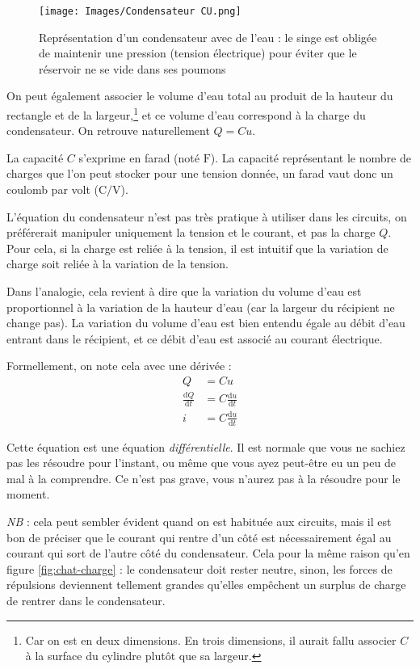 \documentclass{article}
\newcommand{\inc}{\fontfamily{cmr}\selectfont\textperiodcentered}
\begin{document}
\begin{figure}[h]
\centering
\texttt{[image: Images/Condensateur CU.png]}
\caption{Représentation d'un condensateur avec de l'eau : le singe est obligée de maintenir une pression (tension électrique) pour éviter que le réservoir ne se vide dans ses poumons}
\label{fig:reservoir}
\end{figure}

On peut également associer le volume d'eau total au produit de la hauteur du rectangle et de la largeur,\footnote{Car on est en deux dimensions. En trois dimensions, il aurait fallu associer $C$ à la surface du cylindre plutôt que sa largeur.} et ce volume d'eau correspond à la charge du condensateur. On retrouve naturellement $Q=Cu$.

La capacité $C$ s'exprime en farad (noté $\si{\farad}$). La capacité représentant le nombre de charges que l'on peut stocker pour une tension donnée, un farad vaut donc un coulomb par volt ($\si{\coulomb\per\volt}$).

L'équation du condensateur n'est pas très pratique à utiliser dans les circuits, on préférerait manipuler uniquement la tension et le courant, et pas la charge $Q$. Pour cela, si la charge est reliée à la tension, il est intuitif que la variation de charge soit reliée à la variation de la tension.

Dans l'analogie, cela revient à dire que la variation du volume d'eau est proportionnel à la variation de la hauteur d'eau (car la largeur du récipient ne change pas). La variation du volume d'eau est bien entendu égale au débit d'eau entrant dans le récipient, et ce débit d'eau est associé au courant électrique.

\noindent Formellement, on note cela avec une dérivée :
\begin{align*}
    Q &= Cu \\
    \frac{\mathrm{d}Q}{\mathrm{d}t} &= C\frac{\mathrm{d}u}{\mathrm{d}t} \\
    i &= C\frac{\mathrm{d}u}{\mathrm{d}t}
\end{align*}

Cette équation est une équation \emph{différentielle}. Il est normale que vous ne sachiez pas les résoudre pour l'instant, ou même que vous ayez peut-être eu un peu de mal à la comprendre. Ce n'est pas grave, vous n'aurez pas à la résoudre pour le moment.

\textit{NB} : cela peut sembler évident quand on est habitué\inc{}e aux circuits, mais il est bon de préciser que le courant qui rentre d'un côté est nécessairement égal au courant qui sort de l'autre côté du condensateur. Cela pour la même raison qu'en figure \ref{fig:chat-charge} : le condensateur doit rester neutre, sinon, les forces de répulsions deviennent tellement grandes qu'elles empêchent un surplus de charge de rentrer dans le condensateur.
\end{document}
